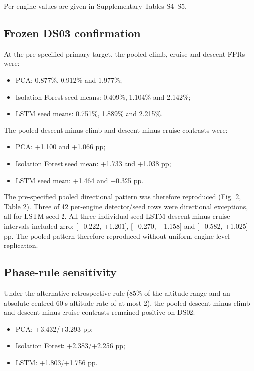 \documentclass[preprint,11pt,a4paper]{elsarticle}
\begin{document}
Per-engine values are given in Supplementary Tables S4–S5.

\subsection{Frozen DS03 confirmation}

At the pre-specified primary target, the pooled climb, cruise and descent FPRs were:
\begin{itemize}
\item PCA: 0.877\%, 0.912\% and 1.977\%;
\item Isolation Forest seed means: 0.409\%, 1.104\% and 2.142\%;
\item LSTM seed means: 0.751\%, 1.889\% and 2.215\%.
\end{itemize}

The pooled descent-minus-climb and descent-minus-cruise contrasts were:
\begin{itemize}
\item PCA: +1.100 and +1.066 pp;
\item Isolation Forest seed mean: +1.733 and +1.038 pp;
\item LSTM seed mean: +1.464 and +0.325 pp.
\end{itemize}

The pre-specified pooled directional pattern was therefore reproduced (Fig. 2, Table 2). Three of 42 per-engine detector/seed rows were directional exceptions, all for LSTM seed 2. All three individual-seed LSTM descent-minus-cruise intervals included zero: [−0.222, +1.201], [−0.270, +1.158] and [−0.582, +1.025] pp. The pooled pattern therefore reproduced without uniform engine-level replication.

\subsection{Phase-rule sensitivity}

Under the alternative retrospective rule (85\% of the altitude range and an absolute centred 60-s altitude rate of at most 2), the pooled descent-minus-climb and descent-minus-cruise contrasts remained positive on DS02:
\begin{itemize}
\item PCA: +3.432/+3.293 pp;
\item Isolation Forest: +2.383/+2.256 pp;
\item LSTM: +1.803/+1.756 pp.
\end{itemize}
\end{document}
